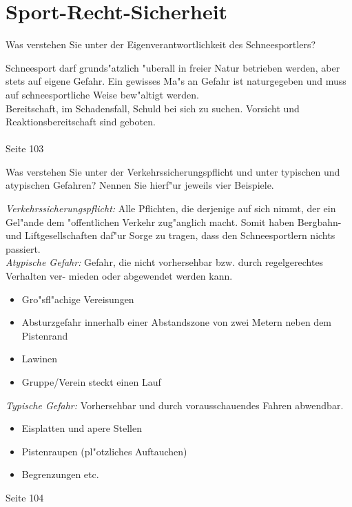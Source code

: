 \section{Sport-Recht-Sicherheit}

\begin{question}{3}
Was verstehen Sie unter der Eigenverantwortlichkeit des Schneesportlers?
\end{question}
\begin{solution}
Schneesport darf grunds"atzlich "uberall in freier Natur betrieben werden, aber stets auf eigene Gefahr. Ein gewisses Ma"s an Gefahr ist naturgegeben und muss auf schneesportliche Weise bew"altigt werden.\\
Bereitschaft, im Schadensfall, Schuld bei sich zu suchen. Vorsicht und Reaktionsbereitschaft sind geboten.\\\\
 Seite 103
\end{solution}

\begin{question}{6}
Was verstehen Sie unter der Verkehrssicherungspflicht und unter typischen und atypischen Gefahren? Nennen Sie hierf"ur jeweils vier Beispiele.
\end{question}
\begin{solution}
\emph{Verkehrssicherungspflicht:} Alle Pflichten, die derjenige auf sich nimmt, der ein Gel"ande dem "offentlichen Verkehr zug"anglich macht. Somit haben Bergbahn- und Liftgesellschaften daf"ur Sorge zu tragen, dass den Schneesportlern nichts passiert.\\
\emph{Atypische Gefahr:} Gefahr, die nicht vorhersehbar bzw. durch regelgerechtes Verhalten ver- mieden oder abgewendet werden kann.
\begin{itemize}
\item Gro"sfl"achige Vereisungen
\item Absturzgefahr innerhalb einer Abstandszone von zwei Metern neben dem Pistenrand
\item Lawinen
\item Gruppe/Verein steckt einen Lauf
\end{itemize}
\emph{Typische Gefahr:} Vorhersehbar und durch vorausschauendes Fahren abwendbar.
\begin{itemize}
\item Eisplatten und apere Stellen
\item Pistenraupen (pl"otzliches Auftauchen)
\item Begrenzungen etc.
\end{itemize}
 Seite 104
\end{solution}

